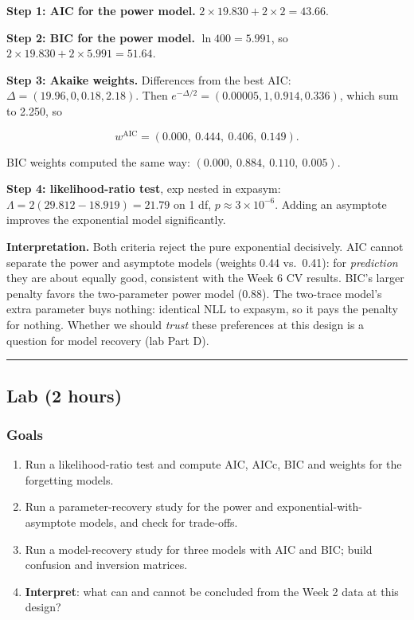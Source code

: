 \textbf{Step 1: AIC for the power model.}
\(2 \times 19.830 + 2 \times 2 = 43.66\).

\textbf{Step 2: BIC for the power model.} \(\ln 400 = 5.991\), so
\(2 \times 19.830 + 2 \times 5.991 = 51.64\).

\textbf{Step 3: Akaike weights.} Differences from the best AIC:
\(\Delta = (19.96, 0, 0.18, 2.18)\). Then
\(e^{-\Delta/2} = (0.00005, 1, 0.914, 0.336)\), which sum to 2.250, so

\[
w^{\text{AIC}} = (0.000,\ 0.444,\ 0.406,\ 0.149).
\]

BIC weights computed the same way: \((0.000,\ 0.884,\ 0.110,\ 0.005)\).

\textbf{Step 4: likelihood-ratio test}, exp nested in expasym:
\(\Lambda = 2(29.812 - 18.919) = 21.79\) on 1 df,
\(p \approx 3 \times 10^{-6}\). Adding an asymptote improves the
exponential model significantly.

\textbf{Interpretation.} Both criteria reject the pure exponential
decisively. AIC cannot separate the power and asymptote models (weights
0.44 vs.~0.41): for \emph{prediction} they are about equally good,
consistent with the Week 6 CV results. BIC's larger penalty favors the
two-parameter power model (0.88). The two-trace model's extra parameter
buys nothing: identical NLL to expasym, so it pays the penalty for
nothing. Whether we should \emph{trust} these preferences at this design
is a question for model recovery (lab Part D).

\begin{center}\rule{0.5\linewidth}{0.5pt}\end{center}


\subsection{Lab (2 hours)}

\subsubsection{Goals}

\begin{enumerate}
\def\labelenumi{\arabic{enumi}.}
\tightlist
\item
  Run a likelihood-ratio test and compute AIC, AICc, BIC and weights for
  the forgetting models.
\item
  Run a parameter-recovery study for the power and
  exponential-with-asymptote models, and check for trade-offs.
\item
  Run a model-recovery study for three models with AIC and BIC; build
  confusion and inversion matrices.
\item
  \textbf{Interpret}: what can and cannot be concluded from the Week 2
  data at this design?
\end{enumerate}


